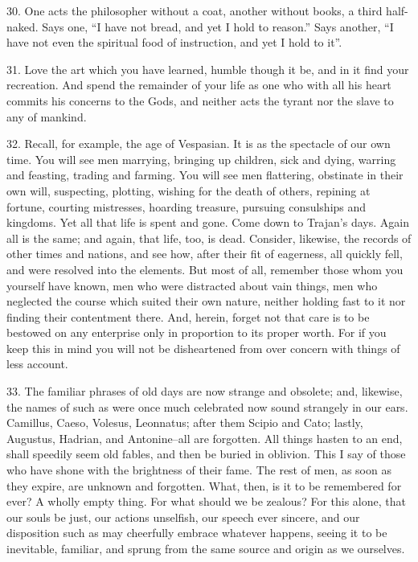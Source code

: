 \documentclass{book}
\begin{document}
30. One acts the philosopher without a coat, another without books, a
third half-naked. Says one, ``I have not bread, and yet I hold to
reason.'' Says another, ``I have not even the spiritual food of
instruction, and yet I hold to it''.

31. Love the art which you have learned, humble though it be, and in
it find your recreation. And spend the remainder of your life as one
who with all his heart commits his concerns to the Gods, and neither
acts the tyrant nor the slave to any of mankind.

32. Recall, for example, the age of Vespasian. It is as the spectacle
of our own time. You will see men marrying, bringing up children, sick
and dying, warring and feasting, trading and farming. You will see men
flattering, obstinate in their own will, suspecting, plotting, wishing
for the death of others, repining at fortune, courting mistresses,
hoarding treasure, pursuing consulships and kingdoms. Yet all that
life is spent and gone. Come down to Trajan's days. Again all is the
same; and again, that life, too, is dead. Consider, likewise, the
records of other times and nations, and see how, after their fit of
eagerness, all quickly fell, and were resolved into the elements. But
most of all, remember those whom you yourself have known, men who were
distracted about vain things, men who neglected the course which
suited their own nature, neither holding fast to it nor finding their
contentment there. And, herein, forget not that care is to be bestowed
on any enterprise only in proportion to its proper worth. For if you
keep this in mind you will not be disheartened from over concern with
things of less account.

33. The familiar phrases of old days are now strange and obsolete;
and, likewise, the names of such as were once much celebrated now
sound strangely in our ears. Camillus, Caeso, Volesus, Leonnatus;
after them Scipio and Cato; lastly, Augustus, Hadrian, and
Antonine--all are forgotten. All things hasten to an end, shall
speedily seem old fables, and then be buried in oblivion. This I say
of those who have shone with the brightness of their fame. The rest of
men, as soon as they expire, are unknown and forgotten. What, then, is
it to be remembered for ever? A wholly empty thing. For what should we
be zealous? For this alone, that our souls be just, our actions
unselfish, our speech ever sincere, and our disposition such as may
cheerfully embrace whatever happens, seeing it to be inevitable,
familiar, and sprung from the same source and origin as we ourselves.
\end{document}
